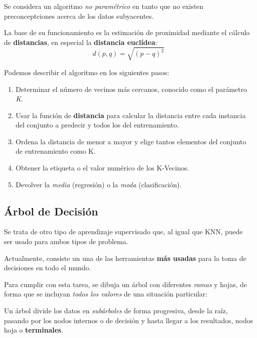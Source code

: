 Se considera un algoritmo \textit{no paramétrico} en tanto que no existen preconceptciones acerca de los datos subyacentes\cite{Belyadi2021SupervisedLearning}.

La base de su funcionamiento es la estimación de proximidad mediante el cálculo de \textbf{distancias}, en especial la \textbf{distancia euclídea}\cite{Greenacre2009CorrespondenceAnalysis}:
\begin{equation}
    d(p,q) = \sqrt{(p-q)^2}
\end{equation}

Podemos describir el algoritmo en los siguientes pasos\cite{Almomany2022OptimizedStudy}: 
\begin{enumerate}
    \item Determinar el número de vecinos más cercanos, conocido como el parámetro \textit{K}.
    \item Usar la función de \textbf{distancia} para calcular la distancia entre cada instancia del conjunto a predecir y todos los del entrenamiento.
    \item Ordena la distancia de menor a mayor y elige tantos elementos del conjunto de entrenamiento como K.
    \item Obtener la etiqueta o el valor numérico de los K-Vecinos.
    \item Devolver la \textit{media} (regresión) o la \textit{moda} (clasificación).
\end{enumerate}


\subsection{Árbol de Decisión}

Se trata de otro tipo de aprendizaje supervisado que, al igual que KNN, puede ser usado para ambos tipos de problema.

Actualmente, consiste un una de las herramientas \textbf{más usadas} para la toma de decisiones\cite{Navada2011OverviewLearning} en todo el mundo.

Para cumplir con esta tarea, se dibuja un árbol con diferentes \textit{ramas} y hojas, de forma que se incluyan \textit{todos los valores} de una situación particular\cite{Navada2011OverviewLearning}:


Un árbol divide los datos en \textit{subárboles} de forma progresiva, desde la raíz, pasando por los nodos internos o de decisión y hasta llegar a los resultados, nodos hoja o \textbf{terminales}.

